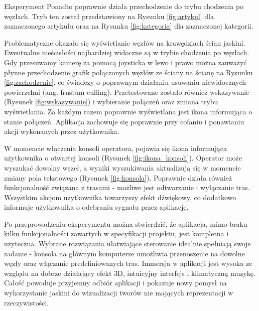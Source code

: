 \begin{chapter}{Eksperyment}
Ponadto poprawnie działa przechodzenie do trybu chodzenia po węzłach. Tryb ten został przedstawiony na Rysunku \ref{fig:artykul} dla zaznaczonego artykułu oraz na Rysunku \ref{fig:kategoria} dla zaznaczonej kategorii. 



Problematyczne okazało się wyświetlanie węzłów na krawędziach ścian jaskini. Ewentualne nieścisłości najbardziej widoczne są w trybie chodzenia po węzłach. Gdy przesuwamy kamerę za pomocą joysticka w lewo i prawo można zauważyć płynne przechodzenie grafik połączonych węzłów ze ściany na ścianę na Rysunku \ref{fig:zachodzenie}, co świadczy o poprawnym działaniu usuwaniu niewidocznych powierzchni (ang. frustum culling). 
Przetestowane zostało również wskazywanie (Rysunek \ref{fig:wskazywanie}) i wybieranie połączeń oraz zmiana trybu wyświetlania. Za każdym razem poprawnie wyświetlana jest ikona informująca o stanie połączeń. Aplikacja zachowuje się poprawnie przy cofaniu i ponawianiu akcji wykonanych przez użytkownika. 



W momencie włączenia konsoli operatora, pojawia się ikona informująca użytkownika o otwartej konsoli (Rysunek \ref{fig:ikona_konsoli}). Operator może wyszukać dowolny węzeł, a wyniki wyszukiwania aktualizują się w momencie zmiany pola tekstowego (Rysunek \ref{fig:konsola}). Poprawnie działa również funkcjonalność związana z trasami - możliwe jest odtwarzanie i wyłączanie tras. Wszystkim akcjom użytkownika towarzyszy efekt dźwiękowy, co dodatkowo informuje użytkownika o odebraniu sygnału przez aplikację.



Po przeprowadzeniu eksperymentu można stwierdzić, że aplikacja, mimo braku kilku funkcjonalności zawartych w specyfikacji projektu, jest kompletna i użyteczna. Wybrane rozwiązania ułatwiające sterowanie idealnie spełniają swoje zadanie - konsola na głównym komputerze umożliwia przenoszenie na dowolne węzły oraz włączanie predefiniowanych tras. Immersja w aplikacji jest wysoka ze względu na dobrze działający efekt 3D, intuicyjny interfejs i klimatyczną muzykę. Całość powoduje przyjemny odbiór aplikacji i pokazuje nowy pomysł na wykorzystanie jaskini do wizualizacji tworów nie mających reprezentacji w rzeczywistości. 

\end{chapter}
